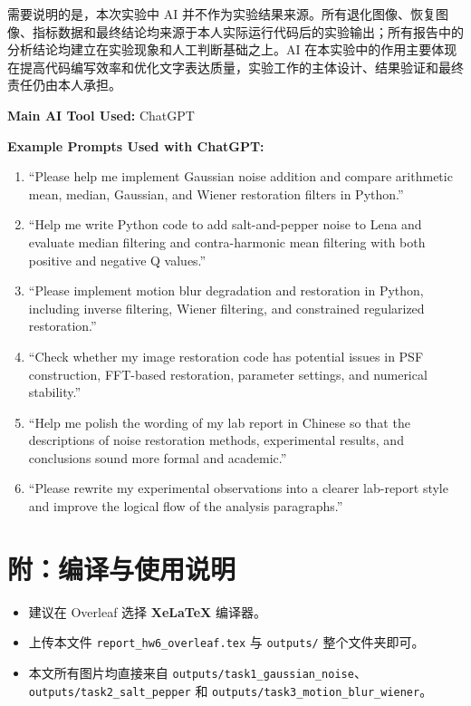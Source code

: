 \documentclass[UTF8,a4paper,12pt]{ctexart}
\begin{document}
需要说明的是，本次实验中 AI 并不作为实验结果来源。所有退化图像、恢复图像、指标数据和最终结论均来源于本人实际运行代码后的实验输出；所有报告中的分析结论均建立在实验现象和人工判断基础之上。AI 在本实验中的作用主要体现在提高代码编写效率和优化文字表达质量，实验工作的主体设计、结果验证和最终责任仍由本人承担。

\vspace{0.5em}
\noindent\textbf{Main AI Tool Used:} ChatGPT

\vspace{0.5em}
\noindent\textbf{Example Prompts Used with ChatGPT:}
\begin{enumerate}
    \item ``Please help me implement Gaussian noise addition and compare arithmetic mean, median, Gaussian, and Wiener restoration filters in Python.''
    \item ``Help me write Python code to add salt-and-pepper noise to Lena and evaluate median filtering and contra-harmonic mean filtering with both positive and negative Q values.''
    \item ``Please implement motion blur degradation and restoration in Python, including inverse filtering, Wiener filtering, and constrained regularized restoration.''
    \item ``Check whether my image restoration code has potential issues in PSF construction, FFT-based restoration, parameter settings, and numerical stability.''
    \item ``Help me polish the wording of my lab report in Chinese so that the descriptions of noise restoration methods, experimental results, and conclusions sound more formal and academic.''
    \item ``Please rewrite my experimental observations into a clearer lab-report style and improve the logical flow of the analysis paragraphs.''
\end{enumerate}

\section*{附：编译与使用说明}
\begin{itemize}
  \item 建议在 Overleaf 选择 \textbf{XeLaTeX} 编译器。
  \item 上传本文件 \texttt{report\_hw6\_overleaf.tex} 与 \texttt{outputs/} 整个文件夹即可。
  \item 本文所有图片均直接来自 \texttt{outputs/task1\_gaussian\_noise}、\texttt{outputs/task2\_salt\_pepper} 和 \texttt{outputs/task3\_motion\_blur\_wiener}。
\end{itemize}
\end{document}
